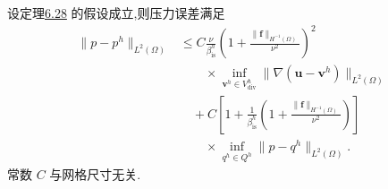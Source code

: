 \begin{theorem}\label{thm:steady-ns-fem-error-pressure}\label{thm:navier-stokes-error-estimate}
设定理\hyperref[thm:steady-ns-fem-error-gradient]{6.28} 的假设成立,则压力误差满足
\begin{equation}\label{eq:steady-ns-fem-pressure-error}
\begin{aligned}
  \|p-p^h\|_{L^2(\Omega)}
   &\le C\frac{\nu}{\beta_{\mathrm{is}}^h}
       \left(1+\frac{\|\bm{f}\|_{H^{-1}(\Omega)}}{\nu^2}\right)^2\\
   &\qquad\times\inf_{\bm{v}^h\in V_{\mathrm{div}}^h}
       \|\nabla(\bm{u}-\bm{v}^h)\|_{L^2(\Omega)}\\
   &\quad+C\left[1+\frac1{\beta_{\mathrm{is}}^h}
       \left(1+\frac{\|\bm{f}\|_{H^{-1}(\Omega)}}{\nu^2}\right)\right]\\
   &\qquad\times\inf_{q^h\in Q^h}\|p-q^h\|_{L^2(\Omega)}.
\end{aligned}
\end{equation}
常数 $C$ 与网格尺寸无关.
\end{theorem}


